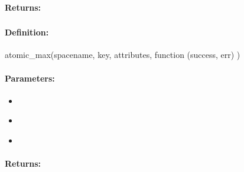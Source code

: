 \paragraph{Returns:}


\pagebreak
\subsubsection{}
\label{api:nodejs:atomic_max}


\paragraph{Definition:}
\begin{javascriptcode}
atomic_max(spacename, key, attributes, function (success, err) {})
\end{javascriptcode}
\paragraph{Parameters:}
\begin{itemize}[noitemsep]
\item {}\\

\item {}\\

\item {}\\

\end{itemize}

\paragraph{Returns:}


\pagebreak
\subsubsection{}
\label{api:nodejs:cond_atomic_max}


